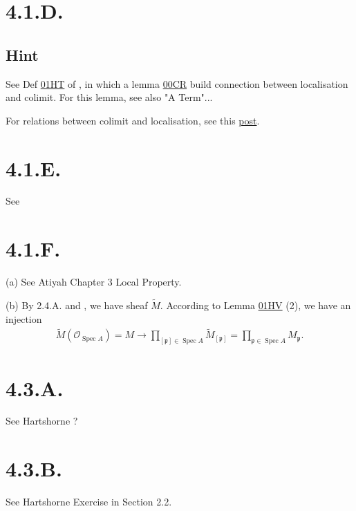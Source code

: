 \section{4.1.D.}\label{4.1.D.}

\subsection{Hint}
See Def \href{https://stacks.math.columbia.edu/tag/01HR}{01HT} of \cite{stacks-project}, in which a lemma \href{https://stacks.math.columbia.edu/tag/00CR}{00CR} build connection between localisation and colimit. For this lemma, see also "A Term"... 

For relations between colimit and localisation, see this \href{https://math.stackexchange.com/questions/664471/representing-localization-as-a-direct-limit}{post}.

\section{4.1.E.}\label{4.1.E.}

See 

\section{4.1.F.}\label{4.1.F.}

(a) See Atiyah \cite{atiyah1994introduction} Chapter 3 Local Property.

(b) By 2.4.A. and , we have sheaf $\widetilde M$. According to Lemma \href{https://stacks.math.columbia.edu/tag/01HR}{01HV} (2), we have an injection
\begin{align*}
	\widetilde M (\mathcal O_{\operatorname{Spec}A})=M \to \prod_{[\mathfrak p]\in \operatorname{Spec}A} \widetilde M_{[\mathfrak p]}=\prod_{\mathfrak p\in\operatorname{Spec}A}M_{\mathfrak p}.
\end{align*} 

\section{4.3.A.}\label{4.3.A.}

See Hartshorne \cite{hartshorne2013algebraic}?

\section{4.3.B.}\label{4.3.B.}
See Hartshorne\cite{hartshorne2013algebraic} Exercise in Section 2.2.
